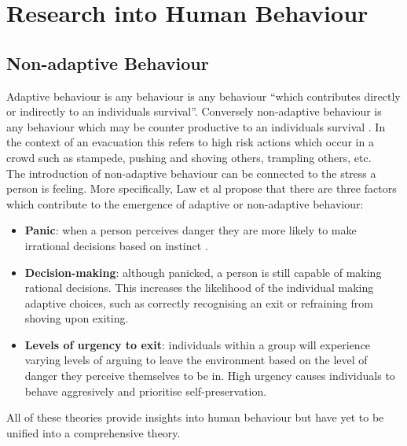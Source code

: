 %

\section{Research into Human Behaviour}
\label{Res:sec:humanBehaviour}
\subsection{Non-adaptive Behaviour}
\label{Res:subsec:nonadaptive}
Adaptive behaviour is any behaviour is any behaviour ``which contributes directly or indirectly to an individuals survival''.
Conversely non-adaptive behaviour is any behaviour which may be counter productive to an individuals survival \cite{AdaptiveBehaviourWiki}.
In the context of an evacuation this refers to high risk actions which occur in a crowd such as stampede, pushing and shoving others,
trampling others, etc.\\
The introduction of non-adaptive behaviour can be connected to the stress a person is feeling. More specifically, Law et al \cite{CIFEResearchProposal} propose that there are three factors which contribute to the emergence of adaptive or non-adaptive behaviour:
\begin{itemize}
  \item{\textbf{Panic}: when a person perceives danger they are more likely to make irrational decisions based on instinct \cite{PanMASSEgressThesis}.}
  \item{\textbf{Decision-making}: although panicked, a person is still capable of making rational decisions. This increases the likelihood of the individual making adaptive choices, such as correctly recognising an exit or refraining from shoving upon exiting.}
  \item{\textbf{Levels of urgency to exit}: individuals within a group will experience varying levels of arguing to leave the environment based on the level of danger they perceive themselves to be in. High urgency causes individuals to behave aggresively and prioritise self-preservation.}
\end{itemize}
All of these theories provide insights into human behaviour but have yet to be unified into a comprehensive theory.

